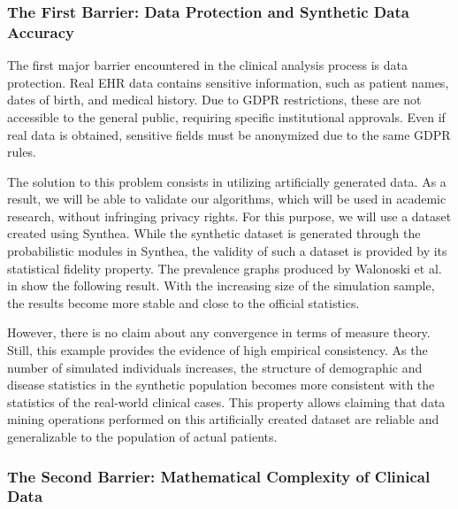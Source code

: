 \subsubsection*{The First Barrier: Data Protection and Synthetic Data Accuracy}

The first major barrier encountered in the clinical analysis process is data protection. Real EHR data contains sensitive information, such as patient names, dates of birth, and medical history. Due to GDPR restrictions, these are not accessible to the general public, requiring specific institutional approvals. Even if real data is obtained, sensitive fields must be anonymized due to the same GDPR rules.

The solution to this problem consists in utilizing artificially generated data. As a result, we will be able to validate our algorithms, which will be used in academic research, without infringing privacy rights. For this purpose, we will use a dataset created using Synthea. While the synthetic dataset is generated through the probabilistic modules in Synthea, the validity of such a dataset is provided by its statistical fidelity property. The prevalence graphs produced by Walonoski et al. in \cite{walonoski2017} show the following result. With the increasing size of the simulation sample, the results become more stable and close to the official statistics.

However, there is no claim about any convergence in terms of measure theory. Still, this example provides the evidence of high empirical consistency. As the number of simulated individuals increases, the structure of demographic and disease statistics in the synthetic population becomes more consistent with the statistics of the real-world clinical cases. This property allows claiming that data mining operations performed on this artificially created dataset are reliable and generalizable to the population of actual patients.

\subsubsection*{The Second Barrier: Mathematical Complexity of Clinical Data}

